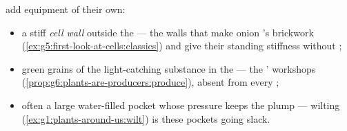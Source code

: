 \begin{proposition}\label{prop:g6:cell-unit-of-life:plantextras}
  add equipment of their own:
\begin{itemize}
  \item a stiff \emph{cell wall} outside
        the  --- the walls that make onion 's
        brickwork (\cref{ex:g5:first-look-at-cells:classics})
        and give  their standing stiffness without
        ;
  \item green grains of the light-catching substance in the
         --- the ' workshops
        (\cref{prop:g6:plants-are-producers:produce}),
        absent from every  ;
  \item often a large water-filled pocket whose pressure
        keeps the  plump --- wilting
        (\cref{ex:g1:plants-around-us:wilt}) is these
        pockets going slack.
\end{itemize}
\end{proposition}
\admitted

